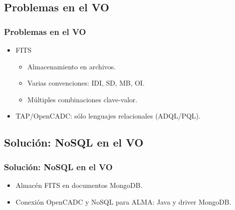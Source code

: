 \documentclass[serif,12pt]{beamer}
\begin{document}
\subsection{Problemas en el VO}
\begin{frame}
\frametitle{Problemas en el VO}

\begin{itemize}
\item FITS
  \begin{itemize}
    \item Almacenamiento en archivos.
    \item Varias convenciones: IDI, SD, MB, OI.
    \item Múltiples combinaciones clave-valor.
  \end{itemize}
\item TAP/OpenCADC: sólo lenguajes relacionales (ADQL/PQL).
\end{itemize}

\end{frame}



\subsection{Solución: NoSQL en el VO}
\begin{frame}
\frametitle{Solución: NoSQL en el VO}

\begin{itemize}
\item Almacén FITS en documentos MongoDB.
\item Conexión OpenCADC y NoSQL para ALMA: Java y driver MongoDB.
\end{itemize}


\end{frame}


\end{document}
